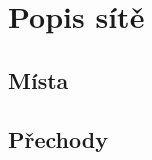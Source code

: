 \section*{Popis sítě}
\label{sec:network_description}

\subsection*{Místa}
\label{subsec:places}

\subsection*{Přechody}
\label{subsec:transitions}

\endinput